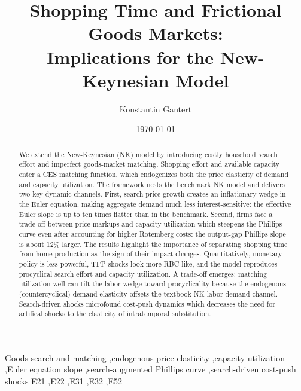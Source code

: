 \documentclass[12pt,3p,authoryear,review]{elsarticle}
\begin{document}
%
\begin{frontmatter}%
\title{Shopping Time and Frictional Goods Markets:\\Implications for the New-Keynesian Model}%
\author[1]{Konstantin Gantert}%
%
%
%
\date{\today}%
\begin{abstract}%
	\begin{small}%
		\onehalfspacing%
		We extend the New-Keynesian (NK) model by introducing costly household search effort and imperfect goods-market matching. Shopping effort and available capacity enter a CES matching function, which endogenizes both the price elasticity of demand and capacity utilization. The framework nests the benchmark NK model and delivers two key dynamic channels. First, search-price growth creates an inflationary wedge in the Euler equation, making aggregate demand much less interest-sensitive: the effective Euler slope is up to ten times flatter than in the benchmark. Second, firms face a trade-off between price markups and capacity utilization which steepens the Phillips curve even after accounting for higher Rotemberg costs: the output-gap Phillips slope is about 12\% larger. The results highlight the importance of separating shopping time from home production as the sign of their impact changes. Quantitatively, monetary policy is less powerful, TFP shocks look more RBC-like, and the model reproduces procyclical search effort and capacity utilization. A trade-off emerges: matching utilization well can tilt the labor wedge toward procyclicality because the endogenous (countercyclical) demand elasticity offsets the textbook NK labor-demand channel. Search-driven shocks microfound cost-push dynamics which decreases the need for artifical shocks to the elasticity of intratemporal substitution.\par%
		\vspace{0.1in}%
	\end{small}%
\end{abstract}%
\begin{keyword}%
	Goods search-and-matching \sep endogenous price elasticity \sep capacity utilization \sep Euler equation slope \sep search-augmented Phillips curve \sep search-driven cost-push shocks%
	\JEL E21 \sep E22 \sep E31 \sep E32 \sep E52%
\end{keyword}%
\end{frontmatter}%
\end{document}
